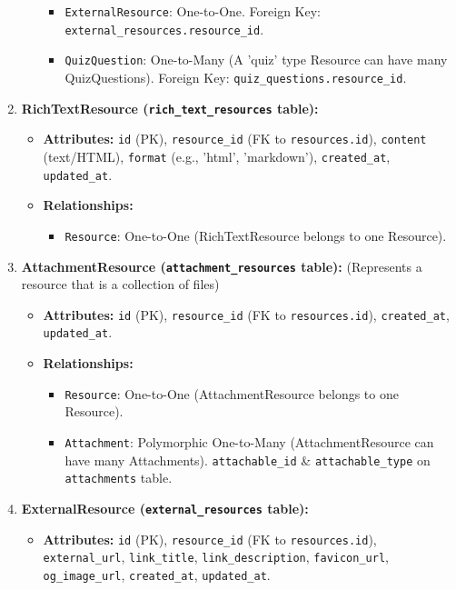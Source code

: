 \begin{enumerate}
\begin{itemize}
\begin{itemize}
            \item \texttt{ExternalResource}: One-to-One. Foreign Key: \texttt{external\_resources.resource\_id}.
            \item \texttt{QuizQuestion}: One-to-Many (A 'quiz' type Resource can have many QuizQuestions). Foreign Key: \texttt{quiz\_questions.resource\_id}.
        \end{itemize}
    \end{itemize}
    \item \textbf{RichTextResource (\texttt{rich\_text\_resources} table):}
    \begin{itemize}
        \item \textbf{Attributes:} \texttt{id} (PK), \texttt{resource\_id} (FK to \texttt{resources.id}), \texttt{content} (text/HTML), \texttt{format} (e.g., 'html', 'markdown'), \texttt{created\_at}, \texttt{updated\_at}.
        \item \textbf{Relationships:}
        \begin{itemize}
            \item \texttt{Resource}: One-to-One (RichTextResource belongs to one Resource).
        \end{itemize}
    \end{itemize}
    \item \textbf{AttachmentResource (\texttt{attachment\_resources} table):} (Represents a resource that is a collection of files)
    \begin{itemize}
        \item \textbf{Attributes:} \texttt{id} (PK), \texttt{resource\_id} (FK to \texttt{resources.id}), \texttt{created\_at}, \texttt{updated\_at}.
        \item \textbf{Relationships:}
        \begin{itemize}
            \item \texttt{Resource}: One-to-One (AttachmentResource belongs to one Resource).
            \item \texttt{Attachment}: Polymorphic One-to-Many (AttachmentResource can have many Attachments). \texttt{attachable\_id} \& \texttt{attachable\_type} on \texttt{attachments} table.
        \end{itemize}
    \end{itemize}
    \item \textbf{ExternalResource (\texttt{external\_resources} table):}
    \begin{itemize}
        \item \textbf{Attributes:} \texttt{id} (PK), \texttt{resource\_id} (FK to \texttt{resources.id}), \texttt{external\_url}, \texttt{link\_title}, \texttt{link\_description}, \texttt{favicon\_url}, \texttt{og\_image\_url}, \texttt{created\_at}, \texttt{updated\_at}.

\end{itemize}
\end{enumerate}
